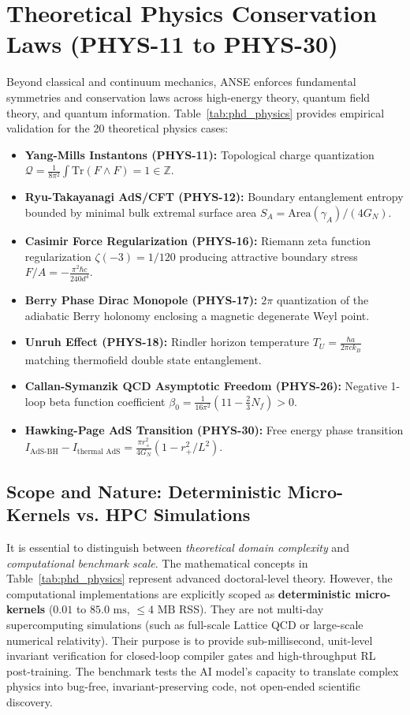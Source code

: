 \documentclass[10pt,journal,compsoc]{IEEEtran}
\theoremstyle{definition}
\begin{document}
\section{Theoretical Physics Conservation Laws (PHYS-11 to PHYS-30)}
Beyond classical and continuum mechanics, ANSE enforces fundamental symmetries and conservation laws across high-energy theory, quantum field theory, and quantum information. Table~\ref{tab:phd_physics} provides empirical validation for the 20 theoretical physics cases:
\begin{itemize}
    \item \textbf{Yang-Mills Instantons (PHYS-11):} Topological charge quantization $\mathcal{Q} = \frac{1}{8\pi^2} \int \text{Tr}(F \wedge F) = 1 \in \mathbb{Z}$.
    \item \textbf{Ryu-Takayanagi AdS/CFT (PHYS-12):} Boundary entanglement entropy bounded by minimal bulk extremal surface area $S_A = \text{Area}(\gamma_A) / (4 G_N)$.
    \item \textbf{Casimir Force Regularization (PHYS-16):} Riemann zeta function regularization $\zeta(-3) = 1/120$ producing attractive boundary stress $F/A = -\frac{\pi^2 \hbar c}{240 d^4}$.
    \item \textbf{Berry Phase Dirac Monopole (PHYS-17):} $2\pi$ quantization of the adiabatic Berry holonomy enclosing a magnetic degenerate Weyl point.
    \item \textbf{Unruh Effect (PHYS-18):} Rindler horizon temperature $T_U = \frac{\hbar a}{2\pi c k_B}$ matching thermofield double state entanglement.
    \item \textbf{Callan-Symanzik QCD Asymptotic Freedom (PHYS-26):} Negative 1-loop beta function coefficient $\beta_0 = \frac{1}{16\pi^2}(11 - \frac{2}{3}N_f) > 0$.
    \item \textbf{Hawking-Page AdS Transition (PHYS-30):} Free energy phase transition $I_{\text{AdS-BH}} - I_{\text{thermal AdS}} = \frac{\pi r_+^2}{4 G_N}(1 - r_+^2/L^2)$.
\end{itemize}

\subsection{Scope and Nature: Deterministic Micro-Kernels vs. HPC Simulations}
It is essential to distinguish between \textit{theoretical domain complexity} and \textit{computational benchmark scale}. The mathematical concepts in Table~\ref{tab:phd_physics} represent advanced doctoral-level theory. However, the computational implementations are explicitly scoped as \textbf{deterministic micro-kernels} ($0.01$ to $85.0\text{ ms}$, $\le 4\text{ MB}$ RSS). They are not multi-day supercomputing simulations (such as full-scale Lattice QCD or large-scale numerical relativity). Their purpose is to provide sub-millisecond, unit-level invariant verification for closed-loop compiler gates and high-throughput RL post-training. The benchmark tests the AI model's capacity to translate complex physics into bug-free, invariant-preserving code, not open-ended scientific discovery.
\end{document}
